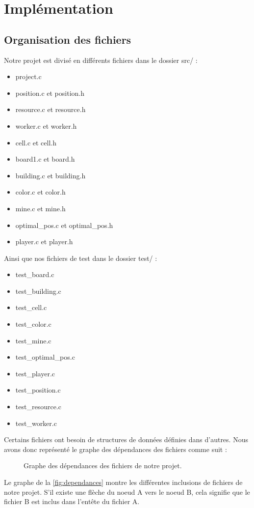 \documentclass[a4paper,12pt]{report}
\begin{document}
\chapter{Implémentation}
\section{Organisation des fichiers} \label{organisation}
Notre projet est divisé en différents fichiers dans le dossier src/ : 
\begin{itemize}
    \item project.c
    \item position.c et position.h
    \item resource.c et resource.h 
    \item worker.c et worker.h
    \item cell.c et cell.h
    \item board1.c et board.h
    \item building.c et building.h
    \item color.c et color.h
    \item mine.c et mine.h
    \item optimal\_pos.c et optimal\_pos.h
    \item player.c et player.h
\end{itemize}
\vspace{0.5cm}
Ainsi que nos fichiers de test dans le dossier test/ : 
\begin{itemize}
    \item test\_board.c
    \item test\_building.c
    \item test\_cell.c
    \item test\_color.c
    \item test\_mine.c
    \item test\_optimal\_pos.c
    \item test\_player.c
    \item test\_position.c
    \item test\_resource.c
    \item test\_worker.c
\end{itemize}
\vspace{0.5cm}
Certains fichiers ont besoin de structures de données définies dans d'autres. Nous avons donc représenté le graphe des dépendances des fichiers comme suit : 
\begin{figure}[H]
    \begin{center}
    
    \end{center}
    \caption{Graphe des dépendances des fichiers de notre projet.}
    \label{fig:dependances}
\end{figure}
Le graphe de la \autoref{fig:dependances} montre les différentes inclusions de fichiers de notre projet. S'il existe une flèche du noeud A vers 
le noeud B, cela signifie que le fichier B est inclus dans l'entête du fichier A.
\end{document}
